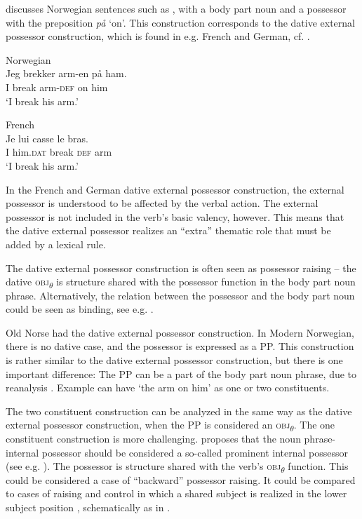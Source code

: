 \documentclass[output=paper,hidelinks]{langscibook}
\begin{document}
\citet{Lodrup09,Lodrup18}  discusses Norwegian sentences such as , with a body part noun and a possessor with the preposition \textit{på} `on'. This construction corresponds to the dative external possessor construction, which is found in e.g. French and German, cf. .


\ea\label{ex:Scandinavian:74} Norwegian\\
\gll
 {Jeg} {brekker} {arm-en} {på} {ham.}\\
 I break arm-\textsc{def} on him\\
\glt `I break his arm.'\z



\ea\label{ex:Scandinavian:75} French\\
\gll
 {Je} {lui} {casse} {le} {bras.}\\
 I him.\textsc{dat} break \textsc{def} arm\\
\glt `I break his arm.'\z

\noindent In the French and German dative external possessor construction, the external possessor is understood to be affected by the verbal action. The external possessor is not included in the verb's basic valency, however. This means that the dative external possessor realizes an ``extra'' thematic role that must be added by a lexical rule.

 The dative external possessor construction is often seen as possessor raising -- the dative \textsc{obj}\textsubscript{${\theta}$} is structure shared with the possessor function in the body part noun phrase. Alternatively, the relation between the possessor and the body part noun could be seen as binding, see e.g. \citet{Deal17}.

 Old Norse had the dative external possessor construction. In Modern Norwegian, there is no dative case, and the possessor is expressed as a PP. This construction is rather similar to the dative external possessor construction, but there is one important difference: The PP can be a part of the body part noun phrase, due to reanalysis \citep{Lodrup09,Lodrup18}. Example  can have `the arm on him' as one or two constituents.

 The two constituent construction can be analyzed in the same way as the dative external possessor construction, when the PP is considered an \textsc{obj}\textsubscript{${\theta}$}. The one constituent construction is more challenging. \citet{Lodrup18} proposes that the noun phrase-internal possessor should be considered a so-called prominent internal possessor (see e.g. \citealt{Ritchie17}). The possessor is structure shared with the verb's \textsc{obj}\textsubscript{${\theta}$} function. This could be considered a case of ``backward'' possessor raising. It could be compared to cases of raising and control in which a shared subject is realized in the lower subject position \citep{polipots06}, schematically as in .
\end{document}
